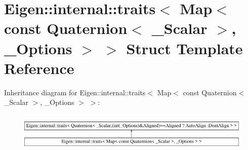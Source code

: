\hypertarget{struct_eigen_1_1internal_1_1traits_3_01_map_3_01const_01_quaternion_3_01___scalar_01_4_00_01___options_01_4_01_4}{}\section{Eigen\+::internal\+::traits$<$ Map$<$ const Quaternion$<$ \+\_\+\+Scalar $>$, \+\_\+\+Options $>$ $>$ Struct Template Reference}
\label{struct_eigen_1_1internal_1_1traits_3_01_map_3_01const_01_quaternion_3_01___scalar_01_4_00_01___options_01_4_01_4}
Inheritance diagram for Eigen\+::internal\+::traits$<$ Map$<$ const Quaternion$<$ \+\_\+\+Scalar $>$, \+\_\+\+Options $>$ $>$\+:\begin{figure}[H]
\begin{center}
\leavevmode
\includegraphics[height=1.821138cm]{struct_eigen_1_1internal_1_1traits_3_01_map_3_01const_01_quaternion_3_01___scalar_01_4_00_01___options_01_4_01_4}
\end{center}
\end{figure}
